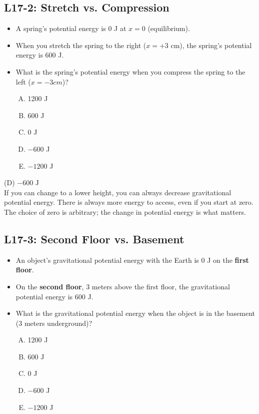 \documentclass[]{article}
\newcommand{\Week}{17}
\begin{document}
\begin{PresentSpace}
\vspace{-10pt}
\section*{L\Week-2: Stretch vs. Compression}
\vspace{-10pt}
\begin{itemize}
	\item A spring's potential energy is 0 J at $x=0$ (equilibrium).
	\item When you stretch the spring to the right ($x=+3$ cm), the spring's potential energy is 600 J.
	\item What is the spring's potential energy when you compress the spring to the left ($x=-3cm$)?
	\begin{enumerate}[(A)]
		\item 1200 J
		\item 600 J
		\item 0 J
		\item $-600$ J
		\item $-1200$ J
	\end{enumerate}
\end{itemize}
\end{PresentSpace}
\newpage
\begin{TeacherMargin}
\noindent (D) $-$600 J \\
If you can change to a lower height, you can always decrease gravitational potential energy. There is always more energy to access, even if you start at zero. The choice of zero is arbitrary; the change in potential energy is what matters.
\end{TeacherMargin}
\begin{PresentSpace}
\vspace{-10pt}
\section*{L\Week-3: Second Floor vs. Basement}
\vspace{-10pt}
\begin{itemize}
	\item An object's gravitational potential energy with the Earth is 0 J on the \textbf{first floor}.
	\item On the \textbf{second floor}, 3 meters above the first floor, the gravitational potential energy is 600 J.
	\item What is the gravitational potential energy when the object is in the basement (3 meters underground)?
	\begin{enumerate}[(A)]
		\item 1200 J
		\item 600 J
		\item 0 J
		\item $-600$ J
		\item $-1200$ J
	\end{enumerate}
\end{itemize}
\end{PresentSpace}
\end{document}
